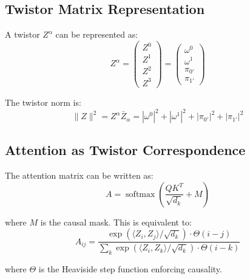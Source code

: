 \documentclass[12pt,a4paper]{article}
\theoremstyle{definition}
\DeclareMathOperator{\softmax}{softmax}
\begin{document}
\subsection{Twistor Matrix Representation}

A twistor $Z^\alpha$ can be represented as:
\begin{equation}
Z^\alpha = \begin{pmatrix} Z^0 \\ Z^1 \\ Z^2 \\ Z^3 \end{pmatrix} = \begin{pmatrix} \omega^0 \\ \omega^1 \\ \pi_{0'} \\ \pi_{1'} \end{pmatrix}
\end{equation}

The twistor norm is:
\begin{equation}
\|Z\|^2 = Z^\alpha \bar{Z}_\alpha = |\omega^0|^2 + |\omega^1|^2 + |\pi_{0'}|^2 + |\pi_{1'}|^2
\end{equation}

\subsection{Attention as Twistor Correspondence}

The attention matrix can be written as:
\begin{equation}
A = \softmax\left(\frac{QK^T}{\sqrt{d_k}} + M\right)
\end{equation}

where $M$ is the causal mask. This is equivalent to:
\begin{equation}
A_{ij} = \frac{\exp(\langle Z_i, Z_j \rangle / \sqrt{d_k}) \cdot \Theta(i-j)}{\sum_k \exp(\langle Z_i, Z_k \rangle / \sqrt{d_k}) \cdot \Theta(i-k)}
\end{equation}

where $\Theta$ is the Heaviside step function enforcing causality.
\end{document}
